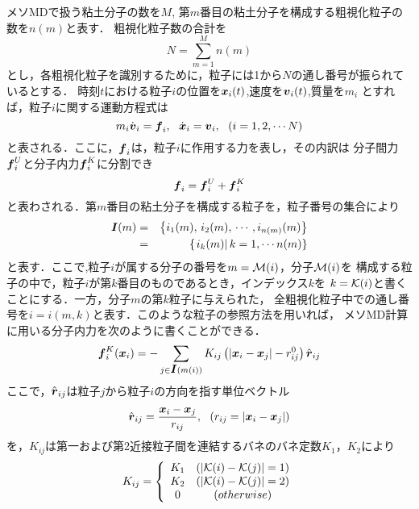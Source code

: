 メソMDで扱う粘土分子の数を$M$, 第$m$番目の粘土分子を構成する粗視化粒子の数を$n(m)$と表す．
粗視化粒子数の合計を
\begin{equation}
	N=\sum_{m=1}^M n(m)
	\label{eqn:N_tot}
\end{equation}
とし，各粗視化粒子を識別するために，粒子には1から$N$の通し番号が振られているとする．
時刻$t$における粒子$i$の位置を$\mbox{\boldmath $x$}_i(t)$,速度を$\mbox{\boldmath $v$}_i(t)$,質量を$m_i$
とすれば，粒子$i$に関する運動方程式は
\begin{equation}
	m_i \dot {\fat{v}}_i =\fat{f}_i ,\ \ 
	\dot{\fat{x}}_i = \fat{v}_i, \ \ ( i =1,2,\cdots N )
	\label{eqn:eq_mot}
\end{equation}
と表される．ここに，$\mbox{\boldmath $f$}_i$は，粒子$i$に作用する力を表し，その内訳は
分子間力$\mbox{\boldmath $f$}_i^{U}$と分子内力$\mbox{\boldmath $f$}_i^{K}$に分割でき
\begin{equation}
	\mbox{\boldmath $f$}_i=\mbox{\boldmath $f$}_i^U+\mbox{\boldmath $f$}_i^K
	\label{eqn:f_tot}
\end{equation}
と表わされる．第$m$番目の粘土分子を構成する粒子を，粒子番号の集合により
\begin{eqnarray}
	\mbox{\boldmath $I$}(m) &=&
	\left\{ 
		i_1(m), \, i_2(m), \, \cdots, i_{n(m)}(m)
	\right\}
	 \nonumber \\
	&=&
	\left\{ 
		\left. i_k(m)\right| k=1,\cdots n(m)
	\right\}
	\label{eqn:set_Im}
\end{eqnarray}
と表す．ここで,粒子$i$が属する分子の番号を$m={\cal M}(i)$，分子${\cal M}(i)$を
構成する粒子の中で，粒子$i$が第$k$番目のものであるとき，インデックス$k$を
$k={\cal K}(i)$と書くことにする．一方，分子$m$の第$k$粒子に与えられた，
全粗視化粒子中での通し番号を$i=i(m,k)$と表す．このような粒子の参照方法を用いれば，
メソMD計算に用いる分子内力を次のように書くことができる．
\begin{equation}
	\mbox{\boldmath $f$}^K_i(\mbox{\boldmath $x$}_i)=
	-\sum_{j \in \mbox{\boldmath $I$}(m(i))} K_{ij}
	 \left( \left| \mbox{\boldmath $x$}_i -\mbox{\boldmath $x$}_j \right|-r^0_{ij}\right)
	\hat{\mbox{\boldmath $r$}}_{ij}
	\label{eqn:}
\end{equation}
ここで，$\hat{\mbox{\boldmath $r$}}_{ij}$は粒子$j$から粒子$i$の方向を指す単位ベクトル
\begin{equation}
	\hat{\mbox{\boldmath $r$}}_{ij} = \frac{\mbox{\boldmath $x$}_i-\mbox{\boldmath $x$}_j}
	{r_{ij}}, \ \ \left( r_{ij}=\left| \mbox{\boldmath $x$}_i-\mbox{\boldmath $x$}_j\right|\right)
	\label{eqn:}
\end{equation}
を，$K_{ij}$は第一および第2近接粒子間を連結するバネのバネ定数$K_1$，$K_2$により
\begin{equation}
	K_{ij}=\left\{
	\begin{array}{cc}
		K_1 & \left(\left|{\cal K}(i)-{\cal K}(j)\right|=1\right) \\
		K_2 & \left(\left|{\cal K}(i)-{\cal K}(j)\right|=2\right) \\
		0   & (otherwise)
	\end{array}
	\right.
	\label{eqn:}
\end{equation}
